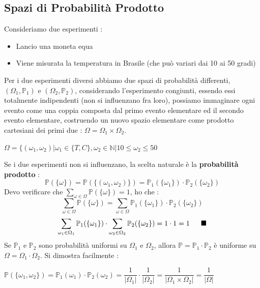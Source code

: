 \documentclass[12pt, letterpaper]{article}
\begin{document}
\subsection{Spazi di Probabilità Prodotto}
Consideriamo due esperimenti : \begin{itemize}
    \item Lancio una moneta equa 
    \item Viene misurata la temperatura in Brasile (che può variari dai 10 ai 50 gradi)
\end{itemize}
Per i due esperimenti diversi abbiamo due spazi di probabilità differenti, \((\Omega_1,\mathbb{P}_1)\) e 
\((\Omega_2,\mathbb{P}_2)\), considerando l'esperimento congiunti, essendo essi totalmente indipendenti (non si 
influenzano fra loro), possiamo immaginare ogni evento come una coppia composta dal primo evento elementare ed 
il secondo evento elementare, costruendo un nuovo spazio elementare come prodotto cartesiani
dei primi due : \(\Omega=\Omega_1\times\Omega_2\).\begin{center}
    \( \Omega=\{(\omega_1,\omega_2)|\omega_1\in\{T,C\}, \omega_2\in \mathbb{N} | 10\le\omega_2\le50 \)
\end{center}
Se i due esperimenti non si influenzano, la scelta naturale è la \textbf{probabilità prodotto} :
\begin{equation}
    \mathbb{P}(\{\omega\})=\mathbb{P}(\{(\omega_1,\omega_2)\})=\mathbb{P}_1(\{\omega_1\})\cdot\mathbb{P}_2(\{\omega_2\})
\end{equation}
Devo verificare che \(\displaystyle\sum_{\omega \in \Omega}\mathbb{P}(\{\omega\})=1\), ho che :
\begin{equation}
    \sum_{\omega \in \Omega}\mathbb{P}(\{\omega\})=\sum_{\omega \in \Omega}\mathbb{P}_1(\{\omega_1\})\cdot\mathbb{P}_2(\{\omega_2\})
\end{equation}
\begin{equation}
    \sum_{\omega_1 \in \Omega_1}\mathbb{P}_1(\{\omega_1\})\cdot \sum_{\omega_2 \in \Omega_2}\mathbb{P}_2(\{\omega_2\})=1\cdot1=1 \hphantom{aaa}\blacksquare
\end{equation}
Se \(\mathbb{P}_1\) e \(\mathbb{P}_2\) sono probabilità uniformi su \(\Omega_1\) e \(\Omega_2\), allora 
\(\mathbb{P}=\mathbb{P}_1\cdot\mathbb{P}_2\) è uniforme su \(\Omega=\Omega_1\cdot\Omega_2\). Si dimostra 
facilmente :\begin{center}
    \(
        \mathbb{P}(\{\omega_1,\omega_2\})=\mathbb{P}_1(\omega_1)\cdot\mathbb{P}_2(\omega_2)=\dfrac{1}{|\Omega_1|}\cdot\dfrac{1}{|\Omega_2|}=\dfrac{1}{|\Omega_1\times\Omega_2|}=\dfrac{1}{|\Omega|}
    \)
\end{center}
\end{document}
